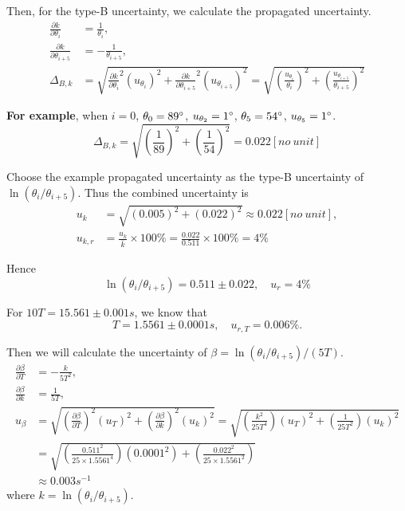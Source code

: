     Then, for the type-B uncertainty, we calculate the propagated uncertainty.
    \[
    \begin{split}
        \frac{\partial k}{\partial \theta_{i}}&=\frac{1}{\theta_i},\\
        \frac{\partial k}{\partial \theta_{i+5}}&=-\frac{1}{\theta_{i+5}},\\
        \Delta_{B,k}&=\sqrt{\frac{\partial k}{\partial \theta_{i}}^2(u_{\theta_i})^2+\frac{\partial k}{\partial \theta_{i+5}}^2(u_{\theta_{i+5}})^2}
        =\sqrt{(\frac{u_{\theta_i}}{\theta_i})^2+(\frac{u_{\theta_{i+5}}}{\theta_{i+5}})^2}
    \end{split}
    \]

    \textbf{For example}, when $i=0$, $\theta_0=89^\circ$, $u_{\theta_2}=1^\circ$, $\theta_5=54^\circ$, $u_{\theta_5}=1^\circ$.
    \[
        \Delta_{B,k}=\sqrt{(\frac{1}{89})^2+(\frac{1}{54})^2}=0.022[no\ unit]
    \]

    Choose the example propagated uncertainty as the type-B uncertainty of $\ln(\theta_i/\theta_{i+5})$. Thus the combined uncertainty is 
    \[
    \begin{split}
        u_{k}&=\sqrt{(0.005)^2+(0.022)^2}\approx0.022[no\ unit],\\
        u_{k,r}&=\frac{u_k}{\bar{k}}\times100\%=\frac{0.022}{0.511}\times100\%=4\%
    \end{split}
    \]

    Hence
    \[
        \ln(\theta_i/\theta_{i+5})=0.511\pm0.022, \quad u_r=4\%
    \]

    For $10T=15.561\pm0.001s$, we know that
    \[
        T=1.5561\pm0.0001s, \quad u_{r,T}=0.006\%.
    \]

    Then we will calculate the uncertainty of $\beta=\ln(\theta_i/\theta_{i+5})/(5T)$.
    \[
    \begin{split}
        \frac{\partial \beta}{\partial T}&=-\frac{k}{5T^2},\\
        \frac{\partial \beta}{\partial k}&=\frac{1}{5T},\\
        u_{\beta}&=\sqrt{(\frac{\partial \beta}{\partial T})^2(u_T)^2+(\frac{\partial \beta}{\partial k})^2(u_k)^2}=\sqrt{(\frac{k^2}{25T^4})(u_T)^2+(\frac{1}{25T^2})(u_k)^2}\\
        &=\sqrt{(\frac{0.511^2}{25\times1.5561^4})(0.0001^2)+(\frac{0.022^2}{25\times1.5561^2})}\\
        &\approx0.003s^{-1}
    \end{split}
    \]
    where $k=\ln(\theta_i/\theta_{i+5})$.

